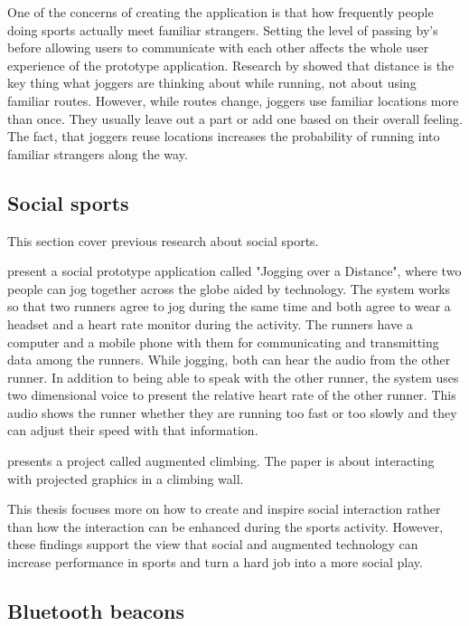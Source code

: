 One of the concerns of creating the application is that how frequently people doing sports actually meet familiar strangers. Setting the level of passing by's before allowing users to communicate with each other affects the whole user experience of the prototype application. Research by \cite{runningNavigation} showed that distance is the key thing what joggers are thinking about while running, not about using familiar routes. However, while routes change, joggers use familiar locations more than once. They usually leave out a part or add one based on their overall feeling. The fact, that joggers reuse locations increases the probability of running into familiar strangers along the way.

\subsection{Social sports}

This section cover previous research about social sports.

\cite{joggingOverDistance} present a social prototype application called "Jogging over a Distance", where two people can jog together across the globe aided by technology. The system works so that two runners agree to jog during the same time and both agree to wear a headset and a heart rate monitor during the activity. The runners have a computer and a mobile phone with them for communicating and transmitting data among the runners. While jogging, both can hear the audio from the other runner. In addition to being able to speak with the other runner, the system uses two dimensional voice to present the relative heart rate of the other runner. This audio shows the runner whether they are running too fast or too slowly and they can adjust their speed with that information.

\cite{augmentedClimbing} presents a project called augmented climbing. The paper is about interacting with projected graphics in a climbing wall. 

This thesis focuses more on how to create and inspire social interaction rather than how the interaction can be enhanced during the sports activity. However, these  findings support the view that social and augmented technology can increase performance in sports and turn a hard job into a more social play.

\subsection{Bluetooth beacons}

